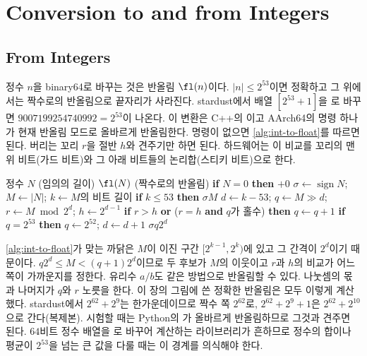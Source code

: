 \section{Conversion to and from Integers}
\label{sec:conversion}

\subsection{From Integers}

정수 $n$을 binary64로 바꾸는 것은 반올림 $\fl(n)$이다. $|n|\le2^{53}$이면 정확하고 그 위에서는 짝수로의 반올림으로 끝자리가 사라진다. stardust에서  배열 $[2^{53}+1]$을 로 바꾸면 $9007199254740992=2^{53}$이 나온다. 이 변환은 C++의 이고 AArch64의  명령 하나가 현재 반올림 모드로 올바르게 반올림한다. 명령이 없으면 \cref{alg:int-to-float}를 따르면 된다. 버리는 꼬리 $r$을 절반 $h$와 견주기만 하면 된다. 하드웨어는 이 비교를 꼬리의 맨 위 비트(가드 비트)와 그 아래 비트들의 논리합(스티키 비트)으로 한다.

\begin{algorithm}[htbp]
\begin{algorithmic}[1]
\Require 정수 $N$ (임의의 길이)
\Ensure $\fl(N)$ (짝수로의 반올림)
\State \textbf{if} $N=0$ \textbf{then} \Return $+0$
\State $\sigma\gets\operatorname{sign}N$; $M\gets|N|$; $k\gets M$의 비트 길이
\State \textbf{if} $k\le53$ \textbf{then} \Return $\sigma M$ 
\State $d\gets k-53$; $q\gets M\gg d$; $r\gets M\bmod2^d$; $h\gets2^{d-1}$
\State \textbf{if} $r>h$ \textbf{or} ($r=h$ \textbf{and} $q$가 홀수) \textbf{then} $q\gets q+1$ 
\State \textbf{if} $q=2^{53}$ \textbf{then} $q\gets2^{52}$; $d\gets d+1$ 
\State \Return $\sigma q2^d$ 
\end{algorithmic}
\caption{정수를 binary64로 올바르게 반올림하기 (넘침은 따로 검사한다)}
\label{alg:int-to-float}
\end{algorithm}

\cref{alg:int-to-float}가 맞는 까닭은 $M$이 이진 구간 $[2^{k-1},2^k)$에 있고 그 간격이 $2^d$이기 때문이다. $q2^d\le M<(q+1)2^d$이므로 두 후보가 $M$의 이웃이고 $r$과 $h$의 비교가 어느 쪽이 가까운지를 정한다. 유리수 $a/b$도 같은 방법으로 반올림할 수 있다. 나눗셈의 몫과 나머지가 $q$와 $r$ 노릇을 한다. 이 장의 그림에 쓴 정확한 반올림은 모두 이렇게 계산했다. stardust에서 $2^{62}+2^9$는 한가운데이므로 짝수 쪽 $2^{62}$로, $2^{62}+2^9+1$은 $2^{62}+2^{10}$으로 간다(복제본). 시험할 때는 Python의 가 올바르게 반올림하므로 그것과 견주면 된다. $64$비트 정수 배열을 로 바꾸어 계산하는 라이브러리가 흔하므로 정수의 합이나 평균이 $2^{53}$을 넘는 큰 값을 다룰 때는 이 경계를 의식해야 한다.

